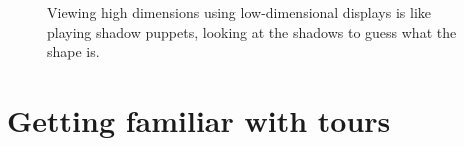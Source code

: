 \documentclass[
  letterpaper,
]{book}
\begin{document}
\begin{figure}
\begin{minipage}[t]{0.33\linewidth}
{{}

}

\end{minipage}%
%
\begin{minipage}[t]{0.33\linewidth}

{\centering 


}

\end{minipage}%

\caption{\label{fig-shadow-puppets}Viewing high dimensions using
low-dimensional displays is like playing shadow puppets, looking at the
shadows to guess what the shape is.}

\end{figure}

\hypertarget{getting-familiar-with-tours}{%
\section{Getting familiar with
tours}\label{getting-familiar-with-tours}}
\end{document}
